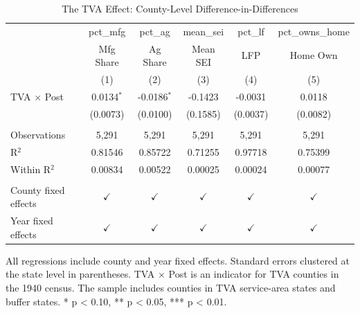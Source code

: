 
\begin{table}[htbp]
   \caption{\label{tab:main_did} The TVA Effect: County-Level Difference-in-Differences}
   \bigskip
   \centering
   \begin{tabular}{lccccc}
      \toprule
                                & pct\_mfg      & pct\_ag       & mean\_sei     & pct\_lf       & pct\_owns\_home\\    
                                & Mfg Share     & Ag Share      & Mean SEI      & LFP           & Home Own \\   
                                & (1)           & (2)           & (3)           & (4)           & (5)\\  
      \midrule 
      TVA $\times$ Post                 & 0.0134$^{*}$  & -0.0186$^{*}$ & -0.1423       & -0.0031       & 0.0118\\   
                                & (0.0073)      & (0.0100)      & (0.1585)      & (0.0037)      & (0.0082)\\   
       \\
      Observations              & 5,291         & 5,291         & 5,291         & 5,291         & 5,291\\  
      R$^2$                     & 0.81546       & 0.85722       & 0.71255       & 0.97718       & 0.75399\\  
      Within R$^2$              & 0.00834       & 0.00522       & 0.00025       & 0.00024       & 0.00077\\  
       \\
      County fixed effects  & $\checkmark$  & $\checkmark$  & $\checkmark$  & $\checkmark$  & $\checkmark$\\   
      Year fixed effects        & $\checkmark$  & $\checkmark$  & $\checkmark$  & $\checkmark$  & $\checkmark$\\   
      \bottomrule
   \end{tabular}
   
   \par \raggedright 
   All regressions include county and year fixed effects. Standard errors clustered at the state level in parentheses. TVA $\times$ Post is an indicator for TVA counties in the 1940 census. The sample includes counties in TVA service-area states and buffer states. * p < 0.10, ** p < 0.05, *** p < 0.01.
\end{table}


